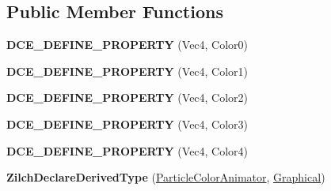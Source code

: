 \subsection*{Public Member Functions}
\begin{DoxyCompactItemize}
\item 
\hypertarget{classDCEngine_1_1Components_1_1ParticleColorAnimator_acb73d59825505ee933977becff0302eb}{{\bfseries D\-C\-E\-\_\-\-D\-E\-F\-I\-N\-E\-\_\-\-P\-R\-O\-P\-E\-R\-T\-Y} (Vec4, Color0)}\label{classDCEngine_1_1Components_1_1ParticleColorAnimator_acb73d59825505ee933977becff0302eb}

\item 
\hypertarget{classDCEngine_1_1Components_1_1ParticleColorAnimator_ad045d04be8beee7f72b016ba3247b56e}{{\bfseries D\-C\-E\-\_\-\-D\-E\-F\-I\-N\-E\-\_\-\-P\-R\-O\-P\-E\-R\-T\-Y} (Vec4, Color1)}\label{classDCEngine_1_1Components_1_1ParticleColorAnimator_ad045d04be8beee7f72b016ba3247b56e}

\item 
\hypertarget{classDCEngine_1_1Components_1_1ParticleColorAnimator_ab96aa0edd888d38f47521b8f372966ff}{{\bfseries D\-C\-E\-\_\-\-D\-E\-F\-I\-N\-E\-\_\-\-P\-R\-O\-P\-E\-R\-T\-Y} (Vec4, Color2)}\label{classDCEngine_1_1Components_1_1ParticleColorAnimator_ab96aa0edd888d38f47521b8f372966ff}

\item 
\hypertarget{classDCEngine_1_1Components_1_1ParticleColorAnimator_a6a30644a6a18bf9849cc13a6fe860e7a}{{\bfseries D\-C\-E\-\_\-\-D\-E\-F\-I\-N\-E\-\_\-\-P\-R\-O\-P\-E\-R\-T\-Y} (Vec4, Color3)}\label{classDCEngine_1_1Components_1_1ParticleColorAnimator_a6a30644a6a18bf9849cc13a6fe860e7a}

\item 
\hypertarget{classDCEngine_1_1Components_1_1ParticleColorAnimator_a073df425ce3064a6d53171735e8600a9}{{\bfseries D\-C\-E\-\_\-\-D\-E\-F\-I\-N\-E\-\_\-\-P\-R\-O\-P\-E\-R\-T\-Y} (Vec4, Color4)}\label{classDCEngine_1_1Components_1_1ParticleColorAnimator_a073df425ce3064a6d53171735e8600a9}

\item 
\hypertarget{classDCEngine_1_1Components_1_1ParticleColorAnimator_a4643c3c388c25e761742662cd302cd0f}{{\bfseries Zilch\-Declare\-Derived\-Type} (\hyperlink{classDCEngine_1_1Components_1_1ParticleColorAnimator}{Particle\-Color\-Animator}, \hyperlink{classDCEngine_1_1Components_1_1Graphical}{Graphical})}\label{classDCEngine_1_1Components_1_1ParticleColorAnimator_a4643c3c388c25e761742662cd302cd0f}


\end{DoxyCompactItemize}
